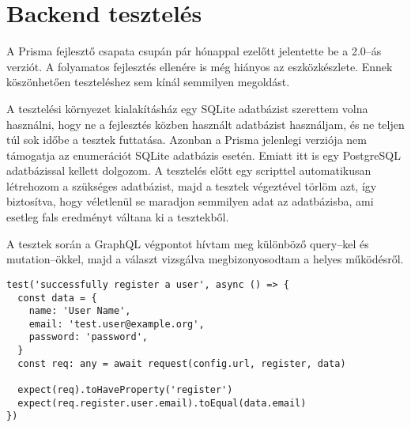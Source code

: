 
\section{Backend tesztelés}
A Prisma fejlesztő csapata csupán pár hónappal ezelőtt jelentette be a 2.0–ás verziót.
A folyamatos fejlesztés ellenére is még hiányos az eszközkészlete.
Ennek köszönhetően teszteléshez sem kínál semmilyen megoldást.

A tesztelési környezet kialakításház egy SQLite adatbázist szerettem volna használni, hogy ne a fejlesztés közben használt adatbázist használjam, és ne teljen túl sok időbe a tesztek futtatása.
Azonban a Prisma jelenlegi verziója nem támogatja az enumerációt SQLite adatbázis esetén.
Emiatt itt is egy PostgreSQL adatbázissal kellett dolgozom.
A tesztelés előtt egy scripttel automatikusan létrehozom a szükséges adatbázist, majd a tesztek végeztével törlöm azt, így biztosítva, hogy véletlenül se maradjon semmilyen adat az adatbázisba, ami esetleg fals eredményt váltana ki a tesztekből.

A tesztek során a GraphQL végpontot hívtam meg különböző query–kel és mutation–ökkel, majd a választ vizsgálva megbizonyosodtam a helyes működésről.


\begin{lstlisting}[style=ES6, caption=Regisztráció első teszt eset]    
test('successfully register a user', async () => {
  const data = {
    name: 'User Name',
    email: 'test.user@example.org',
    password: 'password',
  }
  const req: any = await request(config.url, register, data)

  expect(req).toHaveProperty('register')
  expect(req.register.user.email).toEqual(data.email)
})
\end{lstlisting}
